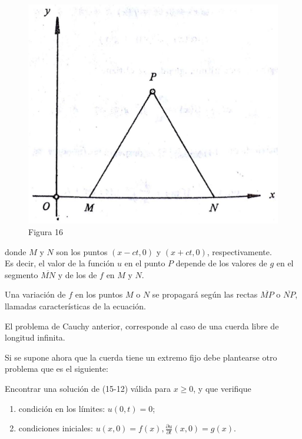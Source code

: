 \documentclass[10pt]{article}
\theoremstyle{plain}
\theoremstyle{definition}
\theoremstyle{remark}
\begin{document}
\begin{figure}[h]
\begin{center}
  \includegraphics[width=\textwidth]{2025_09_05_adecef5eb2053bc129b5g-357}
\captionsetup{labelformat=empty}
\caption{Figura 16}
\end{center}
\end{figure}

donde $M$ y $N$ son los puntos $(x-c t, 0)$ y $(x+c t, 0)$, respectivamente.\\
Es decir, el valor de la función $u$ en el punto $P$ depende de los valores de $g$ en el segmento $\overline{M N}$ y de los de $f$ en $M$ y $N$.

Una variación de $f$ en los puntos $M$ o $N$ se propagará según las rectas $\overline{M P}$ o $\overline{N P}$, llamadas características de la ecuación.

El problema de Cauchy anterior, corresponde al caso de una cuerda libre de longitud infinita.

Si se supone ahora que la cuerda tiene un extremo fijo debe plantearse otro problema que es el siguiente:

Encontrar una solución de (15-12) válida para $x \geqslant 0$, y que verifique

\begin{enumerate}
  \item condición en los límites: $u(0, t)=0$;
  \item condiciones iniciales: $u(x, 0)=f(x), \frac{\partial u}{\partial t}(x, 0)=g(x)$.
\end{enumerate}
\end{document}
